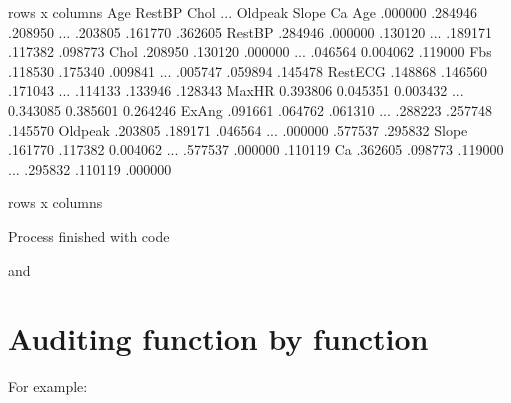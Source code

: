 \documentclass[letterpaper,12pt,english]{sphinxmanual}
\begin{document}
\begin{sphinxVerbatim}[commandchars=\\\{\}]
\PYG{o}{[} rows x  columns\PYG{o}{]}
              Age    RestBP      Chol  ...   Oldpeak     Slope        Ca
Age      .000000  .284946  .208950  ...  .203805  .161770  .362605
RestBP   .284946  .000000  .130120  ...  .189171  .117382  .098773
Chol     .208950  .130120  .000000  ...  .046564 \PYGZhy{}0.004062  .119000
Fbs      .118530  .175340  .009841  ...  .005747  .059894  .145478
RestECG  .148868  .146560  .171043  ...  .114133  .133946  .128343
MaxHR   \PYGZhy{}0.393806 \PYGZhy{}0.045351 \PYGZhy{}0.003432  ... \PYGZhy{}0.343085 \PYGZhy{}0.385601 \PYGZhy{}0.264246
ExAng    .091661  .064762  .061310  ...  .288223  .257748  .145570
Oldpeak  .203805  .189171  .046564  ...  .000000  .577537  .295832
Slope    .161770  .117382 \PYGZhy{}0.004062  ...  .577537  .000000  .110119
Ca       .362605  .098773  .119000  ...  .295832  .110119  .000000

\PYG{o}{[} rows x  columns\PYG{o}{]}

Process finished with  code 
\end{sphinxVerbatim}

and
\begin{quote}

\begin{figure}[htbp]
\centering

\noindent{}
\end{figure}
\end{quote}


\section{Auditing function by function}
\label{\detokenize{demo:id1}}
For example:
\end{document}
